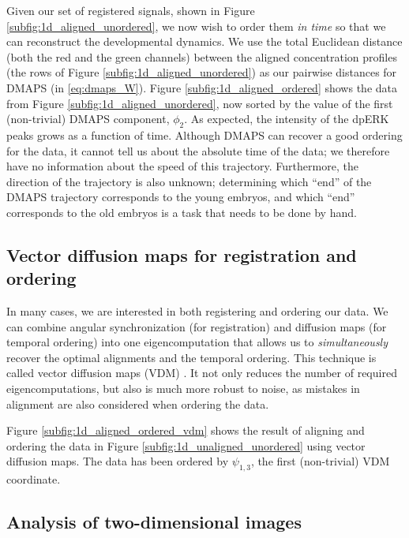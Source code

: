 \documentclass{pnastwo}
\begin{document}
\begin{article}
Given our set of registered signals, shown in Figure \ref{subfig:1d_aligned_unordered}, we now wish to order them {\em in time} so that we can reconstruct the developmental dynamics.
%
We use the total Euclidean distance (both the red and the green channels) between the aligned concentration profiles (the rows of Figure \ref{subfig:1d_aligned_unordered}) as our pairwise distances for DMAPS (in \eqref{eq:dmaps_W}).
%
Figure \ref{subfig:1d_aligned_ordered} shows the data from Figure \ref{subfig:1d_aligned_unordered}, now sorted by the value of the first (non-trivial) DMAPS component, $\phi_2$. 
%
As expected, the intensity of the dpERK peaks grows as a function of time. 
%
Although DMAPS can recover a good ordering for the data, it cannot tell us about the absolute time of the data; we therefore have no information about the speed of this trajectory.
%
Furthermore, the direction of the trajectory is also unknown; determining which ``end'' of the DMAPS trajectory corresponds to the young embryos, and which ``end'' corresponds to the old embryos is a task that needs to be done by hand.

\subsection{Vector diffusion maps for registration and ordering}

In many cases, we are interested in both registering and ordering our data.
%
%
We can combine angular synchronization (for registration) and diffusion maps (for temporal ordering) into one eigencomputation that allows us to {\em simultaneously} recover the optimal alignments and the temporal ordering.
%
This technique is called vector diffusion maps (VDM) \cite{singer2012vector}.
%
It not only reduces the number of required eigencomputations, but also is much more robust to noise, as mistakes in alignment are also considered when ordering the data.

Figure \ref{subfig:1d_aligned_ordered_vdm} shows the result of aligning and ordering the data in Figure \ref{subfig:1d_unaligned_unordered} using vector diffusion maps. 
%
The data has been ordered by $\psi_{1, 3}$, the first (non-trivial) VDM coordinate. 

\subsection{Analysis of two-dimensional images}


\end{article}
\end{document}
